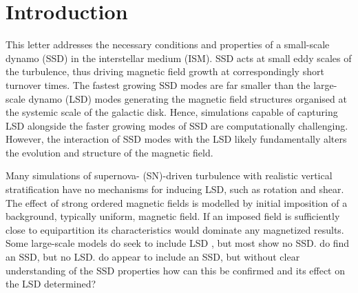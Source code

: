 \documentclass[preprint2]{aastex63}
\newcommand{\fag}[1]{\textcolor{midgreen}{FAG: #1}}
\begin{document}
\section{Introduction}\label{sec:intro}


 This letter addresses the necessary conditions and properties of a small-scale
 dynamo (SSD) in the interstellar medium (ISM).
 SSD acts at small eddy scales of the turbulence, thus driving magnetic field
 growth at correspondingly short turnover times.
 The fastest growing SSD modes are far smaller than the large-scale dynamo
 (LSD) modes generating the magnetic field structures organised at the systemic
 scale of the galactic disk.
 Hence, simulations capable of capturing LSD alongside the faster growing modes
 of SSD are computationally challenging.
 However, the interaction of SSD modes with the LSD likely fundamentally alters
 the evolution and structure of the magnetic field.

 Many simulations of supernova- (SN)-driven turbulence with realistic vertical
 stratification \citep[e.g.,][]{deAvillez:2005,PO07,Hill:2012a,HI14} have no
 mechanisms for inducing LSD, such as rotation and shear.
 The effect of strong ordered magnetic fields is modelled by initial
 imposition of a background, typically uniform, magnetic field.
 If an imposed field is sufficiently close to equipartition its characteristics
 would dominate any magnetized results.
 Some large-scale models do seek to include LSD \citep[e.g.,][]{Korpi:1999b,
 Gressel:2008,HWK09,WA09,Pakmor17,SBADMN19,GE20}, but most show no SSD.
 \citet{SBADMN19} do find an SSD, but no LSD.
 \citet{Gent:2013b,EGSFB16} do appear to include an SSD, but without clear
 understanding of the SSD properties how can this be confirmed and its effect
 on the LSD determined?
     
\end{document}
